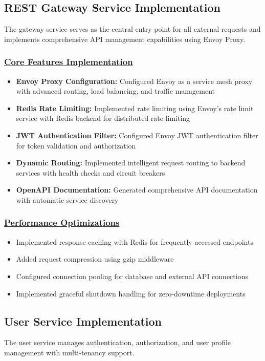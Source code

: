 \subsection{REST Gateway Service Implementation}
The gateway service serves as the central entry point for all external requests and implements comprehensive API management capabilities using Envoy Proxy.

\subsubsection*{\underline{Core Features Implementation}}
\begin{itemize}
    \item \textbf{Envoy Proxy Configuration:} Configured Envoy as a service mesh proxy with advanced routing, load balancing, and traffic management
    \item \textbf{Redis Rate Limiting:} Implemented rate limiting using Envoy's rate limit service with Redis backend for distributed rate limiting
    \item \textbf{JWT Authentication Filter:} Configured Envoy JWT authentication filter for token validation and authorization
    \item \textbf{Dynamic Routing:} Implemented intelligent request routing to backend services with health checks and circuit breakers
    \item \textbf{OpenAPI Documentation:} Generated comprehensive API documentation with automatic service discovery
\end{itemize}

\subsubsection*{\underline{Performance Optimizations}}
\begin{itemize}
    \item Implemented response caching with Redis for frequently accessed endpoints
    \item Added request compression using gzip middleware
    \item Configured connection pooling for database and external API connections
    \item Implemented graceful shutdown handling for zero-downtime deployments
\end{itemize}

\subsection{User Service Implementation}
The user service manages authentication, authorization, and user profile management with multi-tenancy support.

